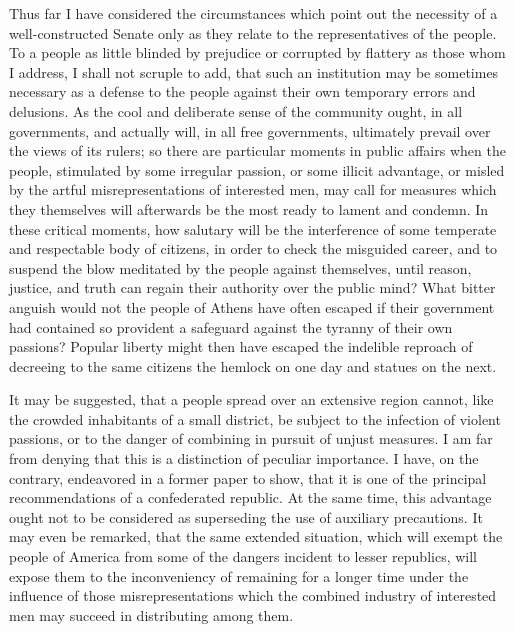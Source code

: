 Thus far I have considered the circumstances which point out the necessity of a well-constructed Senate only as they relate to the representatives of the people. To a people as little blinded by prejudice or corrupted by flattery as those whom I address, I shall not scruple to add, that such an institution may be sometimes necessary as a defense to the people against their own temporary errors and delusions. As the cool and deliberate sense of the community ought, in all governments, and actually will, in all free governments, ultimately prevail over the views of its rulers; so there are particular moments in public affairs when the people, stimulated by some irregular passion, or some illicit advantage, or misled by the artful misrepresentations of interested men, may call for measures which they themselves will afterwards be the most ready to lament and condemn. In these critical moments, how salutary will be the interference of some temperate and respectable body of citizens, in order to check the misguided career, and to suspend the blow meditated by the people against themselves, until reason, justice, and truth can regain their authority over the public mind? What bitter anguish would not the people of Athens have often escaped if their government had contained so provident a safeguard against the tyranny of their own passions? Popular liberty might then have escaped the indelible reproach of decreeing to the same citizens the hemlock on one day and statues on the next.

It may be suggested, that a people spread over an extensive region cannot, like the crowded inhabitants of a small district, be subject to the infection of violent passions, or to the danger of combining in pursuit of unjust measures. I am far from denying that this is a distinction of peculiar importance. I have, on the contrary, endeavored in a former paper to show, that it is one of the principal recommendations of a confederated republic. At the same time, this advantage ought not to be considered as superseding the use of auxiliary precautions. It may even be remarked, that the same extended situation, which will exempt the people of America from some of the dangers incident to lesser republics, will expose them to the inconveniency of remaining for a longer time under the influence of those misrepresentations which the combined industry of interested men may succeed in distributing among them.

